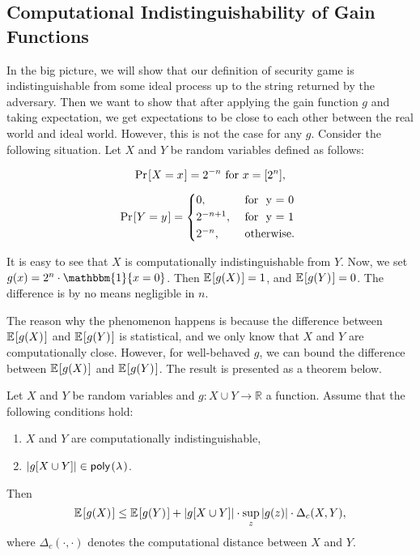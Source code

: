 \subsection{Computational Indistinguishability of Gain Functions}
In the big picture, we will show that our definition of security game is indistinguishable from some ideal process up to the string returned by the adversary. Then we want to show that after applying the gain function $g$ and taking expectation, we get expectations to be close to each other between the real world and ideal world. However, this is not the case for any $g$. Consider the following situation. Let $X$ and $Y$ be random variables defined as follows:

\begin{equation*}
	\prob{X = x} = 2^{-n} \text{ for } x = [2^n],
\end{equation*}

\begin{equation*}
	\prob{Y = y} = 
	\begin{cases*}
		0,        &\text{ for } y = 0 \\
		2^{-n+1}, &\text{ for } y = 1\\
		2^{-n},   &\text{ otherwise.}
	\end{cases*}
\end{equation*}

It is easy to see that $X$ is computationally indistinguishable from $Y$. Now, we set $g(x) = 2^n \cdot \mathbbm{1}\{x=0\}$. Then $\expect{g(X)} = 1$, and $\expect{g(Y)} = 0$. The difference is by no means negligible in $n$.

The reason why the phenomenon happens is because the difference between $\expect{g(X)}$ and $\expect{g(Y)}$ is statistical, and we only know that $X$ and $Y$ are computationally close. However, for well-behaved $g$, we can bound the difference between $\expect{g(X)}$ and $\expect{g(Y)}$. The result is presented as a theorem below.


\begin{theorem}
	Let $X$ and $Y$ be random variables and $g: X \cup Y \rightarrow \mathbb{R}$ a function. Assume that the following conditions hold:
	\begin{enumerate}
		\item $X$ and $Y$ are computationally indistinguishable,
		\item $|g[X \cup Y]| \in \poly$.
	\end{enumerate}
	Then
	\begin{equation*}
	\expect{g(X)} \leq \expect{g(Y)} + |g[X \cup Y]| \cdot \sup_{z} |g(z)| \cdot \Delta_c(X,Y),
	\end{equation*}
	where $\Delta_c(\cdot,\cdot)$ denotes the computational distance between $X$ and $Y$.
\end{theorem}

